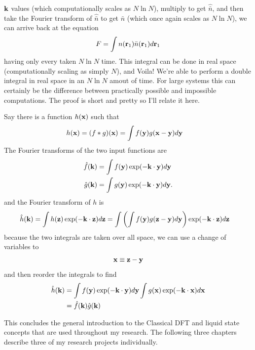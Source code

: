 $\textbf{k}$ values (which computationally scales as $N \ln N$), multiply to
get $\hat{\bar{n}}$, and then take the Fourier transform of
$\hat{\bar{n}}$ to get $\bar{n}$ (which once again scales as $N \ln
N$), we can arrive back at the equation
\begin{align}
F &= \int n(\textbf{r}_1)\bar{n}(\textbf{r}_1)d\textbf{r}_1\\
\end{align}
having only every taken $N \ln N$ time.  This integral can be done in
real space (computationally scaling as simply $N$), and Voila!  We're
able to perform a double integral in real space in an $N \ln N$ amout
of time.  For large systems this can certainly be the difference
between practically possible and impossible computations.  The proof
is short and pretty so I'll relate it here.

Say there is a function $h(\textbf{x})$ such that
\begin{align}
  h(\textbf{x}) &= (f\ast g)(\textbf{x}) = \int f(\textbf{y})g(\textbf{x}-\textbf{y})d\textbf{y}
\end{align}
The Fourier transforms of the two input functions are
\begin{align}
  \hat{f}(\textbf{k}) &= \int f(\textbf{y}) \exp(-\textbf{k} \cdot \textbf{y})d\textbf{y} \\
  \hat{g}(\textbf{k}) &= \int g(\textbf{y}) \exp(-\textbf{k} \cdot \textbf{y})d\textbf{y}.
\end{align}
and the Fourier transform of $h$ is
\begin{align}
  \hat{h}(\textbf{k}) = \int h(\textbf{z}) \exp(-\textbf{k} \cdot \textbf{z}) d\textbf{z} &= \int \left(\int f(\textbf{y}) g(\textbf{z}-\textbf{y})d\textbf{y}\right)  \exp(-\textbf{k} \cdot \textbf{z}) d\textbf{z}
\end{align}
because the two integrals are taken over all space, we can use a
change of variables to
\begin{align}
\textbf{x} \equiv \textbf{z} - \textbf{y}
\end{align}
and then reorder the integrals to find
\begin{align}
\hat{h}(\textbf{k}) &= \int f(\textbf{y}) \exp(-\textbf{k} \cdot \textbf{y} ) d\textbf{y} \int g(\textbf{x}) \exp(-\textbf{k} \cdot \textbf{x}) d\textbf{x} \\
&= \hat{f}(\textbf{k}) \hat{g}(\textbf{k})
\end{align}


This concludes the general introduction to the Classical DFT and
liquid state concepts that are used throughout my research.  The
following three chapters describe three of my research projects
individually.

